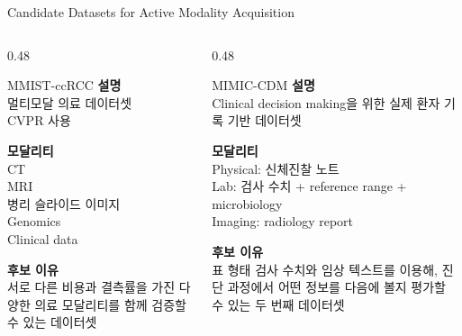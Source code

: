 \documentclass[
11pt,notheorems,hyperref={pdfauthor=whatever}
]{beamer}
\begin{document}
\begin{frame}{Candidate Datasets for Active Modality Acquisition}
\vspace{0.2em}
\begin{columns}[T,onlytextwidth]
\begin{column}{0.48\textwidth}
\begin{block}{MMIST-ccRCC}
\scriptsize
\textbf{설명}\\
멀티모달 의료 데이터셋\\
\textcolor{gray!75}{CVPR 사용}

\vspace{0.45em}
\textbf{모달리티}\\
CT\\
MRI\\
병리 슬라이드 이미지\\
Genomics\\
Clinical data

\vspace{0.45em}
\textbf{후보 이유}\\
서로 다른 비용과 결측률을 가진 다양한 의료 모달리티를 함께 검증할 수 있는 데이터셋
\end{block}
\end{column}
\begin{column}{0.48\textwidth}
\begin{block}{MIMIC-CDM}
\scriptsize
\textbf{설명}\\
Clinical decision making을 위한 실제 환자 기록 기반 데이터셋

\vspace{0.45em}
\textbf{모달리티}\\
Physical: 신체진찰 노트\\
Lab: 검사 수치 + reference range + microbiology\\
Imaging: radiology report

\vspace{0.45em}
\textbf{후보 이유}\\
표 형태 검사 수치와 임상 텍스트를 이용해, 진단 과정에서 어떤 정보를 다음에 볼지 평가할 수 있는 두 번째 데이터셋
\end{block}
\end{column}
\end{columns}
\end{frame}
\end{document}

